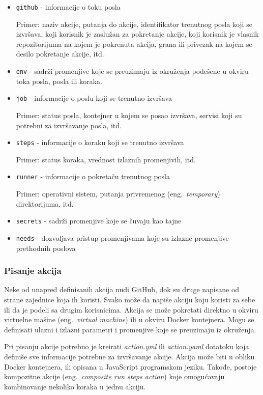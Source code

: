 \documentclass[12pt]{report}
\begin{document}
\begin{itemize}
    \item\texttt{github} - informacije o toku posla

    Primer: naziv akcije, putanja do akcije, identifikator trenutnog posla koji se izvršava, koji korisnik je zaslužan za pokretanje akcije, koji korisnik je vlasnik repozitorijuma na kojem je pokrenuta akcija, grana ili privezak na kojem se desilo pokretanje akcije, itd.
    \item\texttt{env} - sadrži promenjive koje se preuzimaju iz okruženja podešene u okviru toka posla, posla ili koraka.
    \item\texttt{job} - informacije o poslu koji se trenutno izvršava

    Primer: status posla, kontejner u kojem se posao izvršava, servisi koji su potrebni za izvršavanje posla, itd.
    \item\texttt{steps} - informacije o koraku koji se trenutno izvršava

    Primer: status koraka, vrednost izlaznih promenjivih, itd.
    \item\texttt{runner} - informacije o pokretaču trenutnog posla

    Primer: operativni sistem, putanja privremenog (eng.\ \textit{temporary}) direktorijuma, itd.
    \item\texttt{secrets} - sadrži promenjive koje se čuvaju kao tajne
    \item\texttt{needs} - dozvoljava pristup promenjivama koje su izlazne promenjive prethodnih poslova
\end{itemize}

\subsubsection{Pisanje akcija}
Neke od unapred definisanih akcija nudi GitHub, dok su druge napisane od strane zajednice koja ih koristi. Svako može da napiše akciju koju koristi za sebe ili da je podeli sa drugim korisnicima. Akcija se može pokretati direktno u okviru virtuelne mašine (eng.\ \textit{virtual machine}) ili u okviru Docker kontejnera. Mogu se definisati ulazni i izlazni parametri i promenjive koje se preuzimaju iz okruženja.

Pri pisanju akcije potrebno je kreirati \textit{action.yml} ili \textit{action.yaml} dotatoku koja definiše sve informacije potrebne za izvršavanje akcije. Akcija može biti u obliku Docker kontejnera, ili opisana u JavaScript programskom jeziku. Takođe, postoje kompozitne akcije (eng.\ \textit{composite run steps action}) koje omogućavaju kombinovanje nekoliko koraka u jednu akciju.
\end{document}
